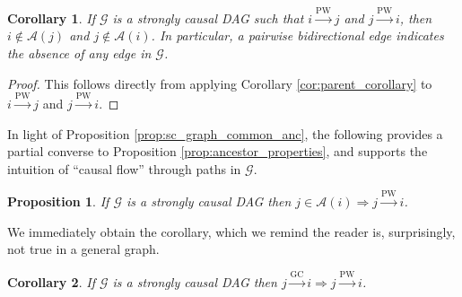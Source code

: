 \documentclass{statsoc}
\def\gc{\overset{\text{GC}}{\rightarrow}}  %
\def\pwgc{\overset{\text{PW}}{\rightarrow}}  %
\def\gcg{\mathcal{G}}  %
\newcommand{\pa}[1]{pa(#1)}  %
\newcommand{\anc}[1]{\mathcal{A}(#1)}  %
\newtheorem{corollary}{Corollary}
\newtheorem{proposition}{Proposition}
\begin{document}
\begin{corollary}
  \label{cor:bidirectional_edge}
  If $\gcg$ is a strongly causal DAG such that $i \pwgc j$ and
  $j \pwgc i$, then $i \not\in \anc{j}$ and $j \not\in \anc{i}$.  In
  particular, a pairwise bidirectional edge indicates the absence of
  any edge in $\gcg$.
\end{corollary}
\begin{proof}
  This follows directly from applying Corollary
  \ref{cor:parent_corollary} to $i \pwgc j$ and $j \pwgc i$.
\end{proof}

In light of Proposition \ref{prop:sc_graph_common_anc}, the following
provides a partial converse to Proposition
\ref{prop:ancestor_properties}, and supports the intuition of ``causal
flow'' through paths in $\gcg$.

\begin{proposition}
  \label{prop:pwgc_anc}
  If $\gcg$ is a strongly causal DAG then $j \in \anc{i} \Rightarrow j \pwgc i$.
\end{proposition}

We immediately obtain the corollary, which we remind the reader is,
surprisingly, not true in a general graph.

\begin{corollary}
  \label{cor:gc_implies_pwgc}
  If $\gcg$ is a strongly causal DAG then $j \gc i \Rightarrow j \pwgc i$.
\end{corollary}
\end{document}
